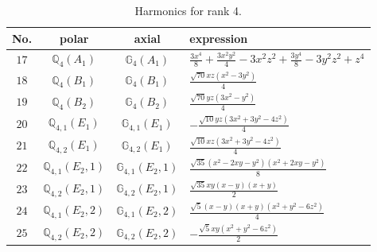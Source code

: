 \documentclass[fleqn,8pt,landscape]{jsarticle}
\begin{document}
\begin{table}[ht!]
\begin{center}
\caption{Harmonics for rank 4.}
\renewcommand{\arraystretch}{1.3}
\begin{tabular}{cccl} \hline \hline
No. & polar & axial & expression \\ \hline
$ 17 $ & $ \mathbb{Q}_{4}(A_{1}) $ & $ \mathbb{G}_{4}(A_{1}) $ & $ \frac{3 x^{4}}{8} + \frac{3 x^{2} y^{2}}{4} - 3 x^{2} z^{2} + \frac{3 y^{4}}{8} - 3 y^{2} z^{2} + z^{4} $ \\
$ 18 $ & $ \mathbb{Q}_{4}(B_{1}) $ & $ \mathbb{G}_{4}(B_{1}) $ & $ \frac{\sqrt{70} x z \left(x^{2} - 3 y^{2}\right)}{4} $ \\
$ 19 $ & $ \mathbb{Q}_{4}(B_{2}) $ & $ \mathbb{G}_{4}(B_{2}) $ & $ \frac{\sqrt{70} y z \left(3 x^{2} - y^{2}\right)}{4} $ \\
$ 20 $ & $ \mathbb{Q}_{4,1}(E_{1}) $ & $ \mathbb{G}_{4,1}(E_{1}) $ & $ - \frac{\sqrt{10} y z \left(3 x^{2} + 3 y^{2} - 4 z^{2}\right)}{4} $ \\
$ 21 $ & $ \mathbb{Q}_{4,2}(E_{1}) $ & $ \mathbb{G}_{4,2}(E_{1}) $ & $ \frac{\sqrt{10} x z \left(3 x^{2} + 3 y^{2} - 4 z^{2}\right)}{4} $ \\
$ 22 $ & $ \mathbb{Q}_{4,1}(E_{2},1) $ & $ \mathbb{G}_{4,1}(E_{2},1) $ & $ \frac{\sqrt{35} \left(x^{2} - 2 x y - y^{2}\right) \left(x^{2} + 2 x y - y^{2}\right)}{8} $ \\
$ 23 $ & $ \mathbb{Q}_{4,2}(E_{2},1) $ & $ \mathbb{G}_{4,2}(E_{2},1) $ & $ \frac{\sqrt{35} x y \left(x - y\right) \left(x + y\right)}{2} $ \\
$ 24 $ & $ \mathbb{Q}_{4,1}(E_{2},2) $ & $ \mathbb{G}_{4,1}(E_{2},2) $ & $ \frac{\sqrt{5} \left(x - y\right) \left(x + y\right) \left(x^{2} + y^{2} - 6 z^{2}\right)}{4} $ \\
$ 25 $ & $ \mathbb{Q}_{4,2}(E_{2},2) $ & $ \mathbb{G}_{4,2}(E_{2},2) $ & $ - \frac{\sqrt{5} x y \left(x^{2} + y^{2} - 6 z^{2}\right)}{2} $ \\
 \hline \hline
\end{tabular}
\end{center}
\end{table}
\end{document}
